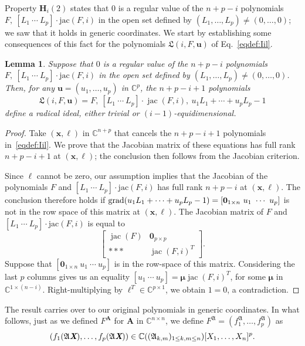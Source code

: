 \documentclass[12pt]{article}
\def\frkL{\mathfrak{L}}
\def\A{\mathfrak{A}}
\def\Xb{\textit{\textbf{X}}}
\def\mA{{\bm A}}
\def\ub{{\bm u}}
\def\xb{{\bm x}}
\DeclareMathOperator{\jac}{jac}
\def\C{\mathbb{C}}
\newtheorem{lemma}[theorem]{Lemma}
\begin{document}
Property ${\bm H}_i(2)$ states that $0$ is a regular value of the
$n+p-i$ polynomials $F,\ [L_1~\cdots~L_p]\cdot \mathrm {jac}(F,i)$ in
the open set defined by $(L_1,\dots,L_p) \ne (0,\dots,0)$; we saw that it
holds in generic coordinates. We start by establishing some
consequences of this fact for the polynomials ${\frkL}(i, F, \bm u)$
of Eq.~\eqref{eqdef:Iil}.
\begin{lemma}\label{prop:RadLagPolarV}
  Suppose that $0$ is a regular value of the $n+p-i$ polynomials
  $F,\ [L_1~\cdots~L_p]\cdot \mathrm {jac}(F,i)$ in the open set
  defined by $(L_1,\dots,L_p) \ne (0,\dots,0)$. Then, for any $\ub =
  (u_1,\hdots,u_p)$ in $\C^p$, the $n+p-i+1$ polynomials
  \begin{equation*}
    {\frkL}(i, F, \bm u) = F,\ [L_1~\cdots~L_p]\cdot \jac(F, i),\ u_1 L_1 + \cdots + u_p L_p -1
  \end{equation*}
  define a radical ideal, either trivial or $(i-1)$-equidimensional.
\end{lemma}
\begin{proof}
  Take $(\xb,\bm \ell)$ in $\C^{n+p}$ that cancels the $n+p-i+1$
  polynomials in~\eqref{eqdef:Iil}. We prove that the Jacobian matrix
  of these equations has full rank $n+p-i+1$ at $(\xb,\bm\ell)$;
  the conclusion then follows from the Jacobian criterion.

  Since $\bm\ell$ cannot be zero, our assumption implies that the
  Jacobian of the polynomials $F$ and $[L_1~\cdots~L_p]\cdot \mathrm
  {jac}(F,i)$ has full rank $n+p-i$ at $(\xb,\bm\ell)$. The conclusion
  therefore holds if ${\rm grad}(u_1 L_1 + \cdots + u_p L_p-1) = [
    {\bm 0}_{1 \times n} ~ u_1~ \cdots ~u_p ]$ is not in the row space
  of this matrix at $(\xb,\bm\ell)$. The Jacobian matrix of $F$ and
  $[L_1~\cdots~L_p]\cdot \mathrm {jac}(F,i)$ is equal to
  \[
  \left[ 
    \begin{array}{cc}
      \jac(F) & {\bm 0}_{p \times p}\\
     *** &  \jac(F,i)^T 
    \end{array}
    \right].
  \]
  Suppose that $[ {\bm 0}_{1 \times n} ~ u_1~ \cdots ~u_p]$ is in the
  row-space of this matrix. Considering the last $p$ columns gives us
  an equality $[u_1 ~ \cdots ~ u_p] = \bm \mu \jac(F,i)^T $, for
  some $\bm \mu$ in $\C^{1 \times (n-i)}$. Right-multiplying by $\bm
  \ell^T \in \C^{p \times 1}$, we obtain $1 = 0$, a contradiction.
\end{proof}

The result carries over to our original polynomials in generic
coordinates. In what follows, just as we defined $F^\mA$ for $\mA$ in
$\C^{n\times n}$, we define $F^{\A}=(f_1^{\A},\hdots,f_p^{\A})$
as \[(f_1(\A\Xb),\hdots,f_p(\A\Xb)) \in \C((\A_{k,m})_{1 \le k,m \le
  n})[X_1,\dots,X_n]^p.\]
\end{document}
